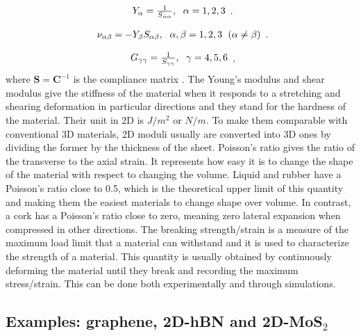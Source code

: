 \begin{equation}
\begin{array}{c}

Y_\alpha=\frac{1}{S_{\alpha\alpha}},\hspace{6 pt} \alpha = 1, 2, 3
\end{array}.
\end{equation}

\begin{equation}
\begin{array}{c}
\nu_{\alpha\beta}=-Y_\beta S_{\alpha\beta},\hspace{6 pt} \alpha, \beta = 1, 2, 3 
\hspace{6 pt}(\alpha\neq\beta)
\end{array}.
\end{equation}

\begin{equation}
\begin{array}{c}
G_{\gamma\gamma}=\frac{1}{S_{\gamma\gamma}} ,\hspace{6 pt} \gamma = 4, 5, 6
\end{array},
\end{equation}
where $\boldsymbol{S}=\boldsymbol{C}^{-1}$ is the compliance matrix \citep[e.g.][]{nye1985physical}. The Young's modulus and shear modulus give the stiffness of the material when it responds to a stretching and shearing deformation in particular directions and they stand for the hardness of the material. Their unit in 2D is $J/m^2$ or $N/m$. To make them comparable with conventional 3D materials, 2D moduli usually are converted into 3D ones by dividing the former by the thickness of the sheet. Poisson's ratio gives the ratio of the transverse to the axial strain. It represents how easy it is to change the shape of the material with respect to changing the volume. Liquid and rubber have a Poisson's ratio close to 0.5, which is the theoretical upper limit of this quantity and making them the easiest materials to change shape over volume. In contrast, a cork has a Poisson's ratio close to zero, meaning zero lateral expansion when compressed in other directions. The breaking strength/strain is a measure of the maximum load limit that a material can withstand and it is used to characterize the strength of a material. This quantity is usually obtained by continuously deforming the material until they break and recording the maximum stress/strain. This can be done both experimentally and through simulations. 

\subsection{Examples: graphene, 2D-hBN and 2D-MoS$_2$}

